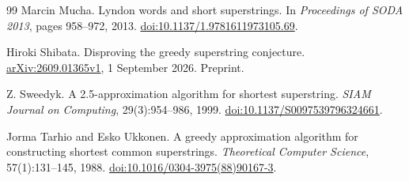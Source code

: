 \begin{thebibliography}{99}
Marcin Mucha.
\newblock Lyndon words and short superstrings.
\newblock In \emph{Proceedings of SODA 2013}, pages 958--972, 2013.
\newblock \href{https://doi.org/10.1137/1.9781611973105.69}{doi:10.1137/1.9781611973105.69}.

Hiroki Shibata.
\newblock Disproving the greedy superstring conjecture.
\newblock \href{https://arxiv.org/abs/2609.01365v1}{arXiv:2609.01365v1},
1 September 2026. Preprint.

Z. Sweedyk.
\newblock A 2.5-approximation algorithm for shortest superstring.
\newblock \emph{SIAM Journal on Computing}, 29(3):954--986, 1999.
\newblock \href{https://doi.org/10.1137/S0097539796324661}{doi:10.1137/S0097539796324661}.

Jorma Tarhio and Esko Ukkonen.
\newblock A greedy approximation algorithm for constructing shortest common superstrings.
\newblock \emph{Theoretical Computer Science}, 57(1):131--145, 1988.
\newblock \href{https://doi.org/10.1016/0304-3975(88)90167-3}{doi:10.1016/0304-3975(88)90167-3}.

\end{thebibliography}
\endgroup
